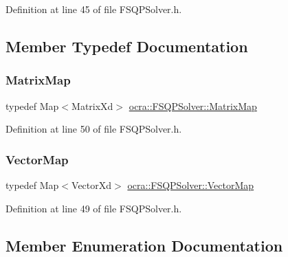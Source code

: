 Definition at line 45 of file F\+S\+Q\+P\+Solver.\+h.



\subsection{Member Typedef Documentation}
\hypertarget{classocra_1_1FSQPSolver_afe309d10ad5c6be082994d6df67e8be1}{}\label{classocra_1_1FSQPSolver_afe309d10ad5c6be082994d6df67e8be1} 
\subsubsection{\texorpdfstring{Matrix\+Map}{MatrixMap}}
{\footnotesize\ttfamily typedef Map$<$Matrix\+Xd$>$ \hyperlink{classocra_1_1FSQPSolver_afe309d10ad5c6be082994d6df67e8be1}{ocra\+::\+F\+S\+Q\+P\+Solver\+::\+Matrix\+Map}}



Definition at line 50 of file F\+S\+Q\+P\+Solver.\+h.

\hypertarget{classocra_1_1FSQPSolver_ac6ad3dde7fc6c45be397240743e4cd9b}{}\label{classocra_1_1FSQPSolver_ac6ad3dde7fc6c45be397240743e4cd9b} 
\subsubsection{\texorpdfstring{Vector\+Map}{VectorMap}}
{\footnotesize\ttfamily typedef Map$<$Vector\+Xd$>$ \hyperlink{classocra_1_1FSQPSolver_ac6ad3dde7fc6c45be397240743e4cd9b}{ocra\+::\+F\+S\+Q\+P\+Solver\+::\+Vector\+Map}}



Definition at line 49 of file F\+S\+Q\+P\+Solver.\+h.



\subsection{Member Enumeration Documentation}
\hypertarget{classocra_1_1FSQPSolver_ad43d4e2dae6954df05123077cea0b7f5}{}\label{classocra_1_1FSQPSolver_ad43d4e2dae6954df05123077cea0b7f5} 
